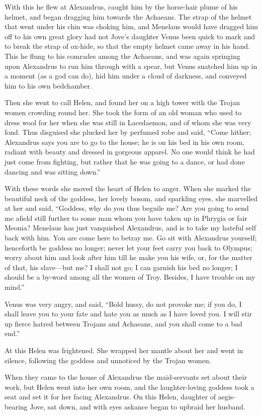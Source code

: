 With this he flew at Alexandrus, caught him by the horse-hair plume of his
helmet, and began dragging him towards the Achaeans. The strap of the
helmet that went under his chin was choking him, and Menelaus would have
dragged him off to his own great glory had not Jove’s daughter Venus been
quick to mark and to break the strap of ox-hide, so that the empty helmet
came away in his hand. This he flung to his comrades among the Achaeans,
and was again springing upon Alexandrus to run him through with a spear,
but Venus snatched him up in a moment (as a god can do), hid him under a
cloud of darkness, and conveyed him to his own bedchamber.

Then she went to call Helen, and found her on a high tower with the Trojan
women crowding round her. She took the form of an old woman who used to
dress wool for her when she was still in Lacedaemon, and of whom she was
very fond. Thus disguised she plucked her by perfumed robe and said, “Come
hither; Alexandrus says you are to go to the house; he is on his bed in
his own room, radiant with beauty and dressed in gorgeous apparel. No one
would think he had just come from fighting, but rather that he was going
to a dance, or had done dancing and was sitting down.”

With these words she moved the heart of Helen to anger. When she marked
the beautiful neck of the goddess, her lovely bosom, and sparkling eyes,
she marvelled at her and said, “Goddess, why do you thus beguile me? Are
you going to send me afield still further to some man whom you have taken
up in Phrygia or fair Meonia? Menelaus has just vanquished Alexandrus, and
is to take my hateful self back with him. You are come here to betray me.
Go sit with Alexandrus yourself; henceforth be goddess no longer; never
let your feet carry you back to Olympus; worry about him and look after
him till he make you his wife, or, for the matter of that, his slave—but
me? I shall not go; I can garnish his bed no longer; I should be a by-word
among all the women of Troy. Besides, I have trouble on my mind.”

Venus was very angry, and said, “Bold hussy, do not provoke me; if you do,
I shall leave you to your fate and hate you as much as I have loved you. I
will stir up fierce hatred between Trojans and Achaeans, and you shall
come to a bad end.”

At this Helen was frightened. She wrapped her mantle about her and went in
silence, following the goddess and unnoticed by the Trojan women.

When they came to the house of Alexandrus the maid-servants set about
their work, but Helen went into her own room, and the laughter-loving
goddess took a seat and set it for her facing Alexandrus. On this Helen,
daughter of aegis-bearing Jove, sat down, and with eyes askance began to
upbraid her husband.

